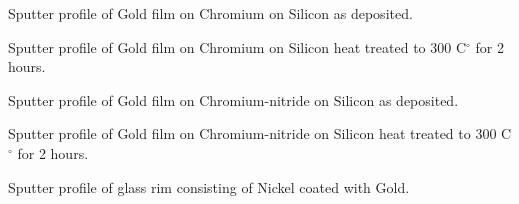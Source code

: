  \newpage

 \vspace*{9cm}

  Sputter profile of Gold film on
 Chromium on Silicon as deposited.\\

 \vspace*{9cm}

  Sputter profile of Gold film on
 Chromium on Silicon heat treated to 300 C$^{\circ}$ for 2
 hours.\\

 \newpage

 \vspace*{9cm}

  Sputter profile of Gold film on
 Chromium-nitride on Silicon as deposited.\\

 \vspace*{9cm}

  Sputter profile of Gold film on
 Chromium-nitride on Silicon heat treated to 300 C$^{\circ}$
 for 2 hours.\\

 \newpage

 \vspace*{12cm}

  Sputter profile of glass rim
 consisting of Nickel coated with Gold.

 \newpage

